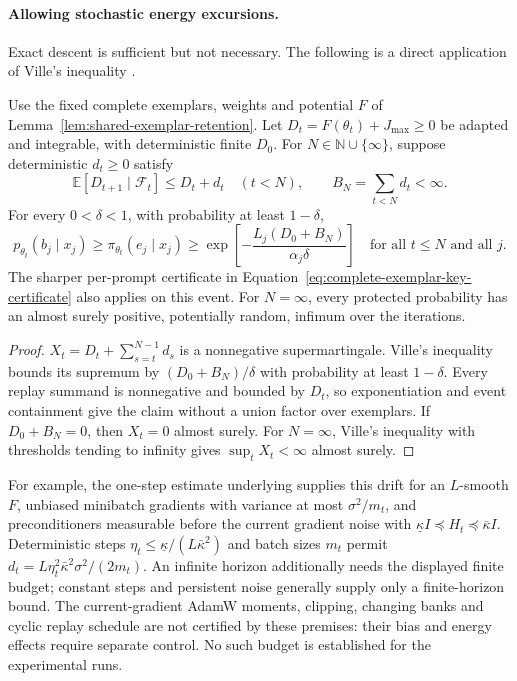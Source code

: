 \paragraph{Allowing stochastic energy excursions.}
Exact descent is sufficient but not necessary. The following is a direct
application of Ville's inequality \citep[Lemma~1]{howard2020timeuniform}.

\begin{corollary}
\label{cor:replay-stochastic-energy-budget}
Use the fixed complete exemplars, weights and potential $F$ of
Lemma~\ref{lem:shared-exemplar-retention}. Let
$D_t=F(\theta_t)+J_{\max}\ge0$ be adapted and integrable, with deterministic
finite $D_0$. For $N\in\mathbb N\cup\{\infty\}$, suppose deterministic
$d_t\ge0$ satisfy
\[
 \mathbb E[D_{t+1}\mid\mathcal F_t]\le D_t+d_t\quad(t<N),
 \qquad B_N=\sum_{t<N}d_t<\infty.
\]
For every $0<\delta<1$, with probability at least $1-\delta$,
\begin{equation}
 p_{\theta_t}(b_j\mid x_j)\ge\pi_{\theta_t}(e_j\mid x_j)
 \ge\exp\!\left[-\frac{L_j(D_0+B_N)}{\alpha_j\delta}\right]
 \quad\text{for all }t\le N\text{ and all }j.
 \label{eq:replay-stochastic-energy-budget}
\end{equation}
The sharper per-prompt certificate in
Equation~\eqref{eq:complete-exemplar-key-certificate} also applies on this
event. For $N=\infty$, every protected probability has an almost surely
positive, potentially random, infimum over the iterations.
\end{corollary}
\begin{proof}
$X_t=D_t+\sum_{s=t}^{N-1}d_s$ is a nonnegative supermartingale. Ville's
inequality bounds its supremum by $(D_0+B_N)/\delta$ with probability at
least $1-\delta$. Every replay summand is nonnegative and bounded by $D_t$,
so exponentiation and event containment give the claim without a union
factor over exemplars. If $D_0+B_N=0$, then $X_t=0$ almost surely.
For $N=\infty$, Ville's inequality with thresholds tending to infinity gives
$\sup_tX_t<\infty$ almost surely.
\end{proof}

For example, the one-step estimate underlying
\citet[Lemma~2.1, Eq.~(2.13)]{wang2017sqn} supplies this drift for an
$L$-smooth $F$, unbiased minibatch gradients with variance at most
$\sigma^2/m_t$, and preconditioners measurable before the current gradient
noise with $\underline\kappa I\preceq H_t\preceq\bar\kappa I$.
Deterministic steps $\eta_t\le\underline\kappa/(L\bar\kappa^2)$ and
batch sizes $m_t$ permit
$d_t=L\eta_t^2\bar\kappa^2\sigma^2/(2m_t)$.
An infinite horizon additionally needs the displayed finite budget;
constant steps and persistent noise generally supply only a finite-horizon
bound. The current-gradient AdamW moments, clipping, changing banks and
cyclic replay schedule are not certified by these premises: their bias and
energy effects require separate control. No such budget is established for
the experimental runs.
